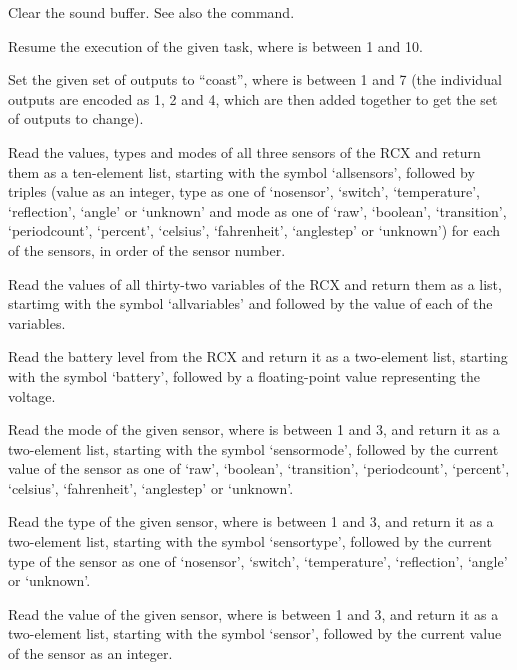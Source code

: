   Clear the sound buffer.
  See also the  command.
  
  Resume the execution of the given task, where  is between 1 and 10.
  
  Set the given set of outputs to ``coast'', where  is between 1 and 7
  (the individual outputs are encoded as 1, 2 and 4, which are then added together to get the set of outputs to change).
  
  Read the values, types and modes of all three sensors of the RCX and return them as a ten-element list, starting with the
  symbol `allsensors', followed by triples (value as an integer, type as one of `nosensor', `switch', `temperature', `reflection',
  `angle' or `unknown' and mode as one of `raw', `boolean', `transition', `periodcount', `percent', `celsius', `fahrenheit',
  `anglestep' or `unknown') for each of the sensors, in order of the sensor number.
  
  Read the values of all thirty-two variables of the RCX and return them as a list, startimg with the
  symbol `allvariables' and followed by the value of each of the variables.
  
  Read the battery level from the RCX and return it as a two-element list, starting with the symbol `battery', followed
  by a floating-point value representing the voltage.
  
  Read the mode of the given sensor, where  is between 1 and 3, and return it as a two-element list,
  starting with the symbol `sensormode', followed by the current value of the sensor as one of `raw', `boolean', `transition', `periodcount', `percent', `celsius', `fahrenheit',
  `anglestep' or `unknown'.
  
  Read the type of the given sensor, where  is between 1 and 3, and return it as a two-element list,
  starting with the symbol `sensortype', followed by the current type of the sensor as one of `nosensor', `switch', `temperature',
  `reflection', `angle' or `unknown'.
  
  Read the value of the given sensor, where  is between 1 and 3, and return it as a two-element list,
  starting with the symbol `sensor', followed by the current value of the sensor as an integer.
  
